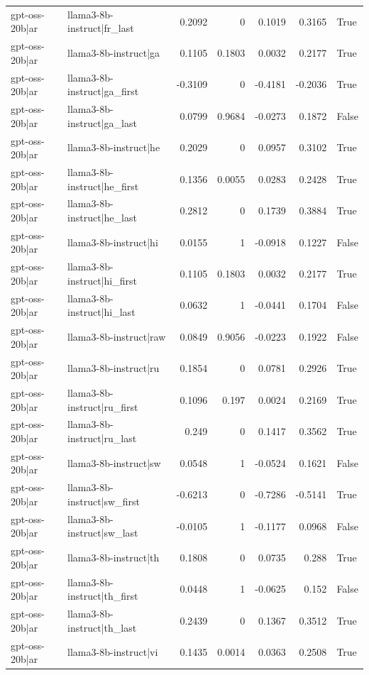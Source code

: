 \begin{table}
\begin{tabular}{l l r r r r l}
gpt-oss-20b|ar & llama3-8b-instruct|fr_last & 0.2092 & 0 & 0.1019 & 0.3165 & True \\
gpt-oss-20b|ar & llama3-8b-instruct|ga & 0.1105 & 0.1803 & 0.0032 & 0.2177 & True \\
gpt-oss-20b|ar & llama3-8b-instruct|ga_first & -0.3109 & 0 & -0.4181 & -0.2036 & True \\
gpt-oss-20b|ar & llama3-8b-instruct|ga_last & 0.0799 & 0.9684 & -0.0273 & 0.1872 & False \\
gpt-oss-20b|ar & llama3-8b-instruct|he & 0.2029 & 0 & 0.0957 & 0.3102 & True \\
gpt-oss-20b|ar & llama3-8b-instruct|he_first & 0.1356 & 0.0055 & 0.0283 & 0.2428 & True \\
gpt-oss-20b|ar & llama3-8b-instruct|he_last & 0.2812 & 0 & 0.1739 & 0.3884 & True \\
gpt-oss-20b|ar & llama3-8b-instruct|hi & 0.0155 & 1 & -0.0918 & 0.1227 & False \\
gpt-oss-20b|ar & llama3-8b-instruct|hi_first & 0.1105 & 0.1803 & 0.0032 & 0.2177 & True \\
gpt-oss-20b|ar & llama3-8b-instruct|hi_last & 0.0632 & 1 & -0.0441 & 0.1704 & False \\
gpt-oss-20b|ar & llama3-8b-instruct|raw & 0.0849 & 0.9056 & -0.0223 & 0.1922 & False \\
gpt-oss-20b|ar & llama3-8b-instruct|ru & 0.1854 & 0 & 0.0781 & 0.2926 & True \\
gpt-oss-20b|ar & llama3-8b-instruct|ru_first & 0.1096 & 0.197 & 0.0024 & 0.2169 & True \\
gpt-oss-20b|ar & llama3-8b-instruct|ru_last & 0.249 & 0 & 0.1417 & 0.3562 & True \\
gpt-oss-20b|ar & llama3-8b-instruct|sw & 0.0548 & 1 & -0.0524 & 0.1621 & False \\
gpt-oss-20b|ar & llama3-8b-instruct|sw_first & -0.6213 & 0 & -0.7286 & -0.5141 & True \\
gpt-oss-20b|ar & llama3-8b-instruct|sw_last & -0.0105 & 1 & -0.1177 & 0.0968 & False \\
gpt-oss-20b|ar & llama3-8b-instruct|th & 0.1808 & 0 & 0.0735 & 0.288 & True \\
gpt-oss-20b|ar & llama3-8b-instruct|th_first & 0.0448 & 1 & -0.0625 & 0.152 & False \\
gpt-oss-20b|ar & llama3-8b-instruct|th_last & 0.2439 & 0 & 0.1367 & 0.3512 & True \\
gpt-oss-20b|ar & llama3-8b-instruct|vi & 0.1435 & 0.0014 & 0.0363 & 0.2508 & True \\

\end{tabular}
\end{table}
